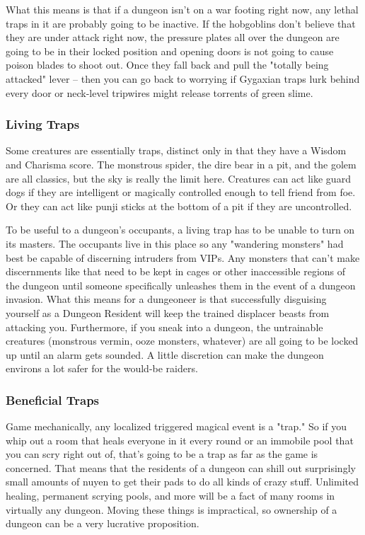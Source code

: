 What this means is that if a dungeon isn't on a war footing right now, any lethal traps in it are probably going to be inactive. If the hobgoblins don't believe that they are under attack right now, the pressure plates all over the dungeon are going to be in their locked position and opening doors is not going to cause poison blades to shoot out. Once they fall back and pull the "totally being attacked" lever -- then you can go back to worrying if Gygaxian traps lurk behind every door or neck-level tripwires might release torrents of green slime.

\subsubsection{Living Traps}

Some creatures are essentially traps, distinct only in that they have a Wisdom and Charisma score. The monstrous spider, the dire bear in a pit, and the golem are all classics, but the sky is really the limit here. Creatures can act like guard dogs if they are intelligent or magically controlled enough to tell friend from foe. Or they can act like punji sticks at the bottom of a pit if they are uncontrolled.

To be useful to a dungeon's occupants, a living trap has to be unable to turn on its masters. The occupants live in this place so any "wandering monsters" had best be capable of discerning intruders from VIPs. Any monsters that can't make discernments like that need to be kept in cages or other inaccessible regions of the dungeon until someone specifically unleashes them in the event of a dungeon invasion. What this means for a dungeoneer is that successfully disguising yourself as a Dungeon Resident will keep the trained displacer beasts from attacking you. Furthermore, if you sneak into a dungeon, the untrainable creatures (monstrous vermin, ooze monsters, whatever) are all going to be locked up until an alarm gets sounded. A little discretion can make the dungeon environs a lot safer for the would-be raiders.

\subsubsection{Beneficial Traps}

Game mechanically, any localized triggered magical event is a "trap." So if you whip out a room that heals everyone in it every round or an immobile pool that you can scry right out of, that's going to be a trap as far as the game is concerned. That means that the residents of a dungeon can shill out surprisingly small amounts of nuyen to get their pads to do all kinds of crazy stuff. Unlimited healing, permanent scrying pools, and more will be a fact of many rooms in virtually any dungeon. Moving these things is impractical, so ownership of a dungeon can be a very lucrative proposition.
